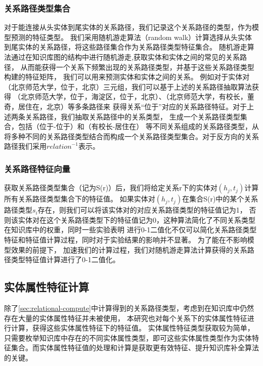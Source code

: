 \subsubsection{关系路径类型集合}
\label{sec:relational-set}

对于能连接从头实体到尾实体的关系路径，我们记录这个关系路径的类型，作为模型预测的特征类型。
我们采用随机游走算法（random walk）\cite{Lovsz1993RandomWO}计算选择从头实体到尾实体的关系路径，将这些路径集合作为关系路径类型特征集合。
随机游走算法通过在知识库图的结构中进行随机游走,获取实体和实体之间的常见的关系路径，
从而能获得一个关系下频繁出现的关系路径类型，并基于这些关系路径类型构建的特征矩阵，
我们可以用来预测实体和实体之间的关系。
例如对于实体对（北京师范大学，位于，北京）三元组，我们可以基于上述的关系路径抽取算法获得
（北京师范大学，位于，海淀区，位于，北京）、（北京师范大学，有校长，董奇，居住在，北京）等多条路径来
获得关系“位于”对应的关系路径特征。对于上述两条关系路径，我们抽取关系路径中的关系类型，
生成一个关系路径类型集合，包括（位于-位于）和（有校长-居住在）
等不同关系组成的关系路径类型，从将多种不同的关系路径类型结合而构成一个关系路径类型集合。对于反方向的关系路径我们采用${relation}^{-1}$表示。

\subsubsection{关系路径特征向量}
获取关系路径类型集合（记为S(r)）后，我们将给定关系r下的实体对$(h_j,t_j)$计算所有关系路径类型集合下的特征值。
如果实体对$(h_j,t_j)$在集合S(r)中的某个关系路径类型$s_i$存在，则我们可以将该实体对的对应关系路径类型的特征值记为1，
否则该实体对在这个关系路径类型下的特征值记为0，这种算法简化了不同关系类型在知识库中的权重，同时一些实验表明\cite{Gardner2014}
进行0-1二值化不仅可以简化关系路径类型特征和特征值计算过程，同时对于实验结果的影响并不显著。
为了能在不影响模型效果的前提下，
加速我们的计算过程，我们对随机游走算法计算获得的关系路径类型特征值计算进行了0-1二值化。

\subsection{实体属性特征计算}
\label{sec:literal-compute}
除了\ref{sec:relational-compute}中计算得到的关系路径类型，考虑到在知识库中仍然存在大量的实体属性特征并未被使用，
本研究也对每个关系下的实体属性特征进行计算，获得这些实体属性特征下的特征值。
实体属性特征类型获取较为简单，只需要枚举知识库中存在的不同实体属性类型，即可这些实体属性类型作为实体特征集合。而实体属性特征值的处理和计算是获取更有效特征、提升知识库补全算法的关键。

